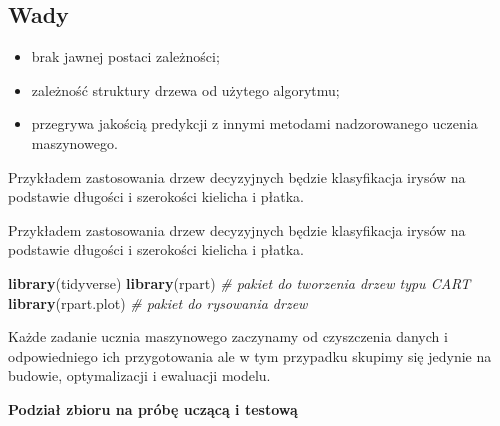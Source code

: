 \documentclass[
]{book}
\newenvironment{Shaded}{\begin{snugshade}}{\end{snugshade}}
\newcommand{\CommentTok}[1]{\textcolor[rgb]{0.56,0.35,0.01}{\textit{#1}}}
\newcommand{\DataTypeTok}[1]{\textcolor[rgb]{0.13,0.29,0.53}{#1}}
\newcommand{\DecValTok}[1]{\textcolor[rgb]{0.00,0.00,0.81}{#1}}
\newcommand{\FloatTok}[1]{\textcolor[rgb]{0.00,0.00,0.81}{#1}}
\newcommand{\KeywordTok}[1]{\textcolor[rgb]{0.13,0.29,0.53}{\textbf{#1}}}
\newcommand{\NormalTok}[1]{#1}
\newcommand{\OperatorTok}[1]{\textcolor[rgb]{0.81,0.36,0.00}{\textbf{#1}}}
\newcommand{\StringTok}[1]{\textcolor[rgb]{0.31,0.60,0.02}{#1}}
\providecommand{\tightlist}{%
  \setlength{\itemsep}{0pt}\setlength{\parskip}{0pt}}
\theoremstyle{plain}
\theoremstyle{definition}
\theoremstyle{definition}
\theoremstyle{definition}
\theoremstyle{definition}
\theoremstyle{remark}
\let\BeginKnitrBlock\begin \let\EndKnitrBlock\end
\begin{document}
\hypertarget{wady}{%
\subsection{Wady}\label{wady}}

\begin{itemize}
\tightlist
\item
  brak jawnej postaci zależności;
\item
  zależność struktury drzewa od użytego algorytmu;
\item
  przegrywa jakością predykcji z innymi metodami nadzorowanego uczenia maszynowego.
\end{itemize}

\BeginKnitrBlock{example}
\protect\hypertarget{exm:przyk41}{}{\label{exm:przyk41} }Przykładem zastosowania drzew decyzyjnych będzie klasyfikacja irysów na podstawie długości i szerokości kielicha i płatka.
\EndKnitrBlock{example}

Przykładem zastosowania drzew decyzyjnych będzie klasyfikacja irysów na podstawie długości i szerokości kielicha i płatka.

\begin{Shaded}
\begin{Highlighting}[]
\KeywordTok{library}\NormalTok{(tidyverse) }
\KeywordTok{library}\NormalTok{(rpart) }\CommentTok{# pakiet do tworzenia drzew typu CART}
\KeywordTok{library}\NormalTok{(rpart.plot) }\CommentTok{# pakiet do rysowania drzew}
\end{Highlighting}
\end{Shaded}

Każde zadanie ucznia maszynowego zaczynamy od czyszczenia danych i odpowiedniego ich przygotowania ale w tym przypadku skupimy się jedynie na budowie, optymalizacji i ewaluacji modelu.

\textbf{Podział zbioru na próbę uczącą i testową}

\begin{Shaded}
\end{Shaded}
\end{document}
